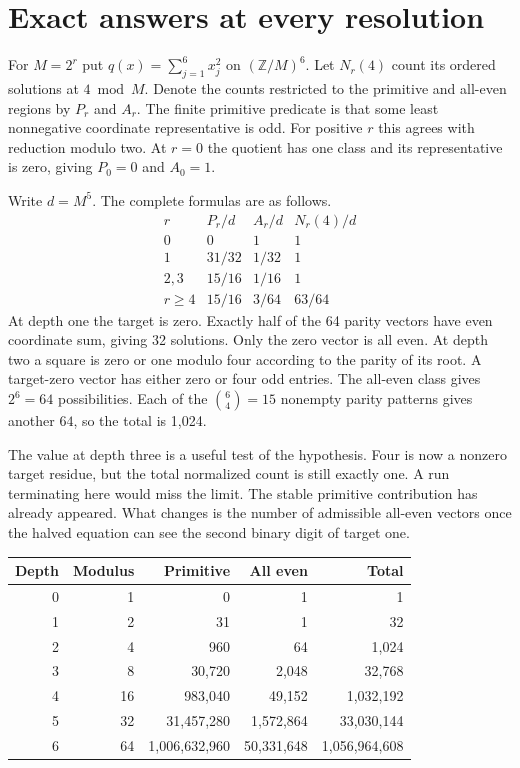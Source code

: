 \documentclass[12pt,letterpaper]{article}
\begin{document}
\section{Exact answers at every resolution}
For $M=2^r$ put $q(x)=\sum_{j=1}^6 x_j^2$ on $(\mathbb Z/M)^6$. Let $N_r(4)$ count its ordered solutions at $4\bmod M$. Denote the counts restricted to the primitive and all-even regions by $P_r$ and $A_r$. The finite primitive predicate is that some least nonnegative coordinate representative is odd. For positive $r$ this agrees with reduction modulo two. At $r=0$ the quotient has one class and its representative is zero, giving $P_0=0$ and $A_0=1$.

Write $d=M^5$. The complete formulas are as follows.
\[
\begin{array}{c|ccc}
 r &P_r/d&A_r/d&N_r(4)/d\\ \hline
 0&0&1&1\\
 1&31/32&1/32&1\\
 2,3&15/16&1/16&1\\
 r\ge4&15/16&3/64&63/64
\end{array}
\]
At depth one the target is zero. Exactly half of the 64 parity vectors have even coordinate sum, giving 32 solutions. Only the zero vector is all even. At depth two a square is zero or one modulo four according to the parity of its root. A target-zero vector has either zero or four odd entries. The all-even class gives $2^6=64$ possibilities. Each of the $\binom64=15$ nonempty parity patterns gives another $64$, so the total is 1,024.

The value at depth three is a useful test of the hypothesis. Four is now a nonzero target residue, but the total normalized count is still exactly one. A run terminating here would miss the limit. The stable primitive contribution has already appeared. What changes is the number of admissible all-even vectors once the halved equation can see the second binary digit of target one.

\begin{center}\small\begin{tabular}{rrrrr}\toprule Depth & Modulus & Primitive & All even & Total\\\midrule
0 & 1 & 0 & 1 & 1\\
1 & 2 & 31 & 1 & 32\\
2 & 4 & 960 & 64 & 1,024\\
3 & 8 & 30,720 & 2,048 & 32,768\\
4 & 16 & 983,040 & 49,152 & 1,032,192\\
5 & 32 & 31,457,280 & 1,572,864 & 33,030,144\\
6 & 64 & 1,006,632,960 & 50,331,648 & 1,056,964,608\\
\bottomrule\end{tabular}\end{center}
\end{document}
